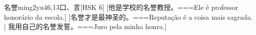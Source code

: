 \begin{EntryWithPhonetic}{名誉}{ming2yu4}{6,13}{⼝、⾔}[HSK 6]
  [他是学校的名誉教授。===Ele é professor honorário da escola.]
  [名誉才是最神圣的。===Reputação é a coisa mais sagrada. | 我用自己的名誉发誓。===Juro pela minha honra.]
\end{EntryWithPhonetic}
